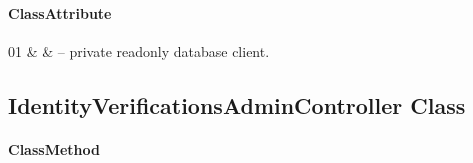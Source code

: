\paragraph{ClassAttribute}
\begin{ClassAttributeTable}
01 &  &  -- private readonly database client. \\ \hline
\end{ClassAttributeTable}

\subsection{IdentityVerificationsAdminController Class}

\paragraph{ClassMethod}
